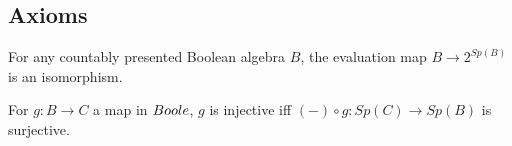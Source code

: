 \subsection{Axioms}\label{Axioms}
\begin{axiom}\label{AxStoneDuality}
  For any countably presented Boolean algebra $B$, 
  the evaluation map $B\rightarrow  2^{Sp(B)}$ is an isomorphism.
\end{axiom} 


\begin{axiom}\label{SurjectionsAreFormalSurjections}
  For $g:B\to C$ a map in $\Boole$, $g$ is injective iff 
  $(-)\circ g: Sp(C) \to Sp(B)$ is surjective. 
\end{axiom} 
%

